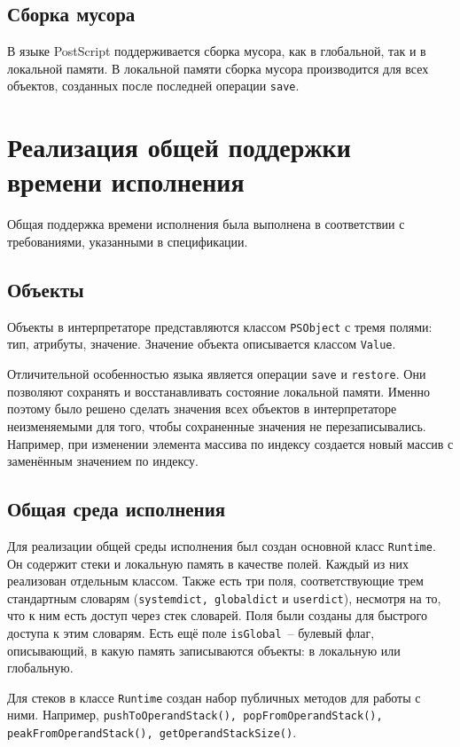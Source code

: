 \documentclass[14pt]{extarticle}
\begin{document}
\subsection{Сборка мусора}
В языке PostScript поддерживается сборка мусора, как в глобальной, так и в локальной памяти. В локальной памяти сборка мусора производится для всех объектов, созданных после последней операции \texttt{save}.

\pagebreak
\section{Реализация общей поддержки времени исполнения}
Общая поддержка времени исполнения была выполнена в соответствии с требованиями, указанными в спецификации.

\subsection{Объекты}
Объекты в интерпретаторе представляются классом \texttt{PSObject} с тремя полями: тип, атрибуты, значение. Значение объекта описывается классом \texttt{Value}.

Отличительной особенностью языка является операции \texttt{save} и \texttt{restore}. Они позволяют сохранять и восстанавливать состояние локальной памяти. Именно поэтому было решено сделать значения всех объектов в интерпретаторе неизменяемыми для того, чтобы сохраненные значения не перезаписывались. Например, при изменении элемента массива по индексу создается новый массив с заменённым значением по индексу.

\subsection{Общая среда исполнения}
Для реализации общей среды исполнения был создан основной класс \texttt{Runtime}. Он содержит стеки и локальную память в качестве полей. Каждый из них реализован отдельным классом. Также есть три поля, соответствующие трем стандартным словарям (\texttt{systemdict, globaldict} и \texttt{userdict}), несмотря на то, что к ним есть доступ через стек словарей. Поля были созданы для быстрого доступа к этим словарям. Есть ещё поле \texttt{isGlobal}~-- булевый флаг, описывающий, в какую память записываются объекты: в локальную или глобальную.

Для стеков в классе \texttt{Runtime} создан набор публичных методов для работы с ними. Например, \texttt{pushToOperandStack(), popFromOperandStack(), peakFromOperandStack(), getOperandStackSize()}. 
\end{document}
